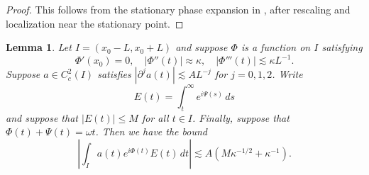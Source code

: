 \documentclass[11pt]{amsart}
\newtheorem{lemma}[theorem]{Lemma}
\theoremstyle{definition}
\theoremstyle{remark}
\numberwithin{equation}{section}
\begin{document}
\begin{proof}
This follows from the stationary phase expansion in
\cite[Chapter~VIII]{Stein:harmonic-analysis}, after rescaling and localization
near the stationary point.
\end{proof}


\begin{lemma}\label{lem:appendix_triangle}
    Let $I = (x_0 - L,x_0 + L )$ and suppose $\Phi$ is a function on $I$ satisfying
    \[\Phi'(x_0) = 0, \quad |\Phi''(t)| \approx \kappa, \quad |\Phi'''(t)| \lesssim \kappa L^{-1}.\]
    Suppose $a \in C^2_c(I)$ satisfies $|\partial^j a(t)| \lesssim A L^{-j}$ for $j = 0, 1, 2$. Write
    \[E(t) = \int_{t}^{\infty}e^{i\Psi(s)} \, ds\]
    and suppose that $|E(t)| \leq M$ for all $t \in I$. Finally, suppose that $\Phi(t) + \Psi(t) = \omega t$. Then we have the bound 
    \[\left|\int_{I}a(t)e^{i\Phi(t)}E(t) \, dt\right| \lesssim A(M\kappa^{-1/2} + \kappa^{-1}).\]
\end{lemma}
\end{document}
